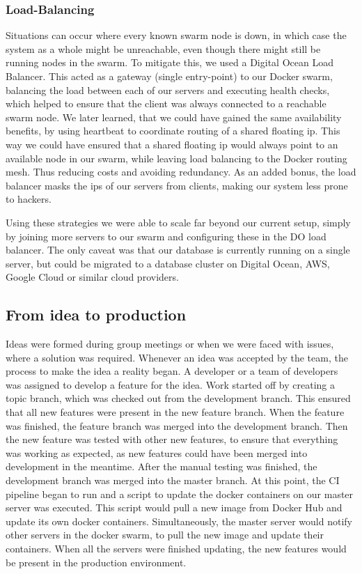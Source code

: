 \subsubsection{Load-Balancing}
Situations can occur where every known swarm node is down, in which case the system as a whole might be unreachable, even though there might still be running nodes in the swarm.
\newline
To mitigate this, we used a Digital Ocean Load Balancer. This acted as a gateway (single entry-point) to our Docker swarm, balancing the load between each of our servers and executing health checks, which helped to ensure that the client was always connected to a reachable swarm node.
\newline
We later learned, that we could have gained the same availability benefits, by using heartbeat to coordinate routing of a shared floating ip.
This way we could have ensured that a shared floating ip would always point to an available node in our swarm, while leaving load balancing to the Docker routing mesh. Thus reducing costs and avoiding redundancy.
\newline
As an added bonus, the load balancer masks the ips of our servers from clients, making our system less prone to hackers.

Using these strategies we were able to scale far beyond our current setup, simply by joining more servers to our swarm and configuring these in the DO load balancer.
The only caveat was that our database is currently running on a single server, but could be migrated to a database cluster on Digital Ocean, AWS, Google Cloud or similar cloud providers.

\subsection{From idea to production}

Ideas were formed during group meetings or when we were faced with issues, where a solution was required.
Whenever an idea was accepted by the team, the process to make the idea a reality began. 
A developer or a team of developers was assigned to develop a feature for the idea. 
Work started off by creating a topic branch, which was checked out from the development branch. 
This ensured that all new features were present in the new feature branch. 
When the feature was finished, the feature branch was merged into the development branch.
Then the new feature was tested with other new features, to ensure that everything was working as expected, as new features could have been merged into development in the meantime. 
After the manual testing was finished, the development branch was merged into the master branch. 
At this point, the CI pipeline began to run and a script to update the docker containers on our master server was executed. 
This script would pull a new image from Docker Hub and update its own docker containers. 
Simultaneously, the master server would notify other servers in the docker swarm, to pull the new image and update their containers. 
When all the servers were finished updating, the new features would be present in the production environment.
